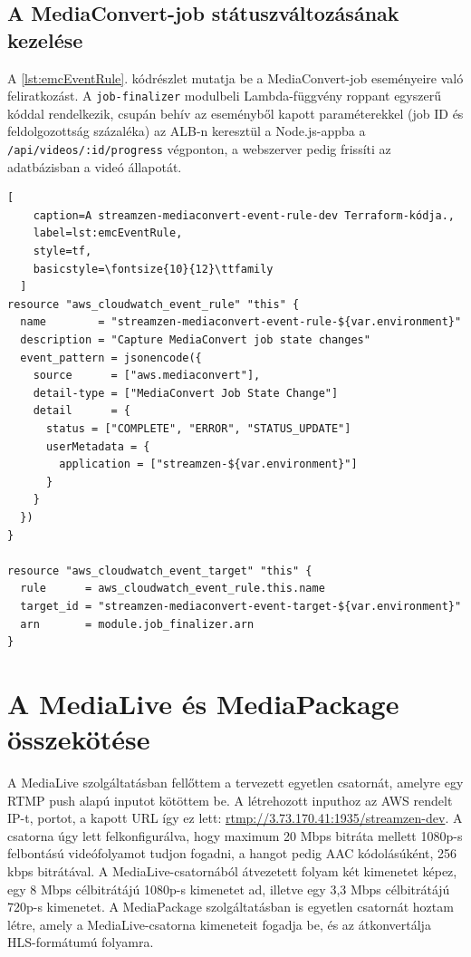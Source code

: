 \subsection{A MediaConvert-job státuszváltozásának kezelése}

A \ref{lst:emcEventRule}. kódrészlet mutatja be a MediaConvert-job eseményeire való feliratkozást. A \verb|job-finalizer| modulbeli Lambda-függvény roppant egyszerű kóddal rendelkezik, csupán behív az eseményből kapott paraméterekkel (job ID és feldolgozottság százaléka) az ALB-n keresztül a Node.js-appba a \verb|/api/videos/:id/progress| végponton, a webszerver pedig frissíti az adatbázisban a videó állapotát.

\begin{minipage}{0.92\textwidth}
  \begin{lstlisting}[
    caption=A streamzen-mediaconvert-event-rule-dev Terraform-kódja.,
    label=lst:emcEventRule,
    style=tf,
    basicstyle=\fontsize{10}{12}\ttfamily
  ]
resource "aws_cloudwatch_event_rule" "this" {
  name        = "streamzen-mediaconvert-event-rule-${var.environment}"
  description = "Capture MediaConvert job state changes"
  event_pattern = jsonencode({
    source      = ["aws.mediaconvert"],
    detail-type = ["MediaConvert Job State Change"]
    detail      = {
      status = ["COMPLETE", "ERROR", "STATUS_UPDATE"]
      userMetadata = {
        application = ["streamzen-${var.environment}"]
      }
    }
  })
}

resource "aws_cloudwatch_event_target" "this" {
  rule      = aws_cloudwatch_event_rule.this.name
  target_id = "streamzen-mediaconvert-event-target-${var.environment}"
  arn       = module.job_finalizer.arn
}
\end{lstlisting}
\end{minipage}

\section{A MediaLive és MediaPackage összekötése}\label{sec:mediaLive}

A MediaLive szolgáltatásban fellőttem a tervezett egyetlen csatornát, amelyre egy RTMP push alapú inputot kötöttem be. A létrehozott inputhoz az AWS rendelt IP-t, portot, a kapott URL így ez lett: \url{rtmp://3.73.170.41:1935/streamzen-dev}. A csatorna úgy lett felkonfigurálva, hogy maximum 20 Mbps bitráta mellett 1080p-s felbontású videófolyamot tudjon fogadni, a hangot pedig AAC kódolásúként, 256 kbps bitrátával. A MediaLive-csatornából átvezetett folyam két kimenetet képez, egy 8 Mbps célbitrátájú 1080p-s kimenetet ad, illetve egy 3,3 Mbps célbitrátájú 720p-s kimenetet. A MediaPackage szolgáltatásban is egyetlen csatornát hoztam létre, amely a MediaLive-csatorna kimeneteit fogadja be, és az átkonvertálja HLS-formátumú folyamra.

